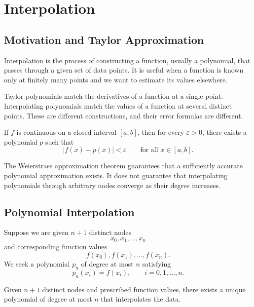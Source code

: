 \section{Interpolation}

\subsection{Motivation and Taylor Approximation}

Interpolation is the process of constructing a function, usually a polynomial, that passes through a given set of data points. It is useful when a function is known only at finitely many points and we want to estimate its values elsewhere.

\begin{remark}
  Taylor polynomials match the derivatives of a function at a single point. Interpolating polynomials match the values of a function at several distinct points. These are different constructions, and their error formulas are different.
\end{remark}

\begin{theorem}
  If \(f\) is continuous on a closed interval \([a,b]\), then for every \(\varepsilon>0\), there exists a polynomial \(p\) such that
  \[
    |f(x)-p(x)|<\varepsilon
    \qquad \text{for all }x\in[a,b].
  \]
\end{theorem}

\begin{remark}
  The Weierstrass approximation theorem guarantees that a sufficiently accurate polynomial approximation exists. It does not guarantee that interpolating polynomials through arbitrary nodes converge as their degree increases.
\end{remark}

\subsection{Polynomial Interpolation}

Suppose we are given \(n+1\) distinct nodes
\[
  x_0,x_1,\ldots,x_n
\]
and corresponding function values
\[
  f(x_0),f(x_1),\ldots,f(x_n).
\]
We seek a polynomial \(p_n\) of degree at most \(n\) satisfying
\[
  p_n(x_i)=f(x_i),
  \qquad i=0,1,\ldots,n.
\]

\begin{theorem}
  Given \(n+1\) distinct nodes and prescribed function values, there exists a unique polynomial of degree at most \(n\) that interpolates the data.
\end{theorem}

